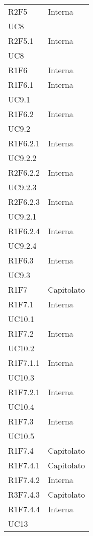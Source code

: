\begin{longtable}{|C{6.5cm}|C{6.5cm}|}
	R2F5 &  \centering Interna \\ UC8 \tabularnewline

	R2F5.1 &  \centering Interna \\ UC8 \tabularnewline

	R1F6 & Interna \\

	R1F6.1 & \centering Interna \\ UC9.1 \tabularnewline

	R1F6.2 & \centering Interna \\ UC9.2 \tabularnewline

	R1F6.2.1 & \centering Interna \\ UC9.2.2 \tabularnewline

	R2F6.2.2 & \centering Interna \\ UC9.2.3 \tabularnewline

	R2F6.2.3 & \centering Interna \\ UC9.2.1 \tabularnewline

	R1F6.2.4 & \centering Interna \\ UC9.2.4 \tabularnewline

	R1F6.3 & \centering Interna \\ UC9.3 \tabularnewline

	R1F7 & Capitolato \\

	R1F7.1 & \centering Interna \\ UC10.1 \tabularnewline

	R1F7.2 &  \centering Interna \\ UC10.2 \tabularnewline

	R1F7.1.1 & \centering Interna \\ UC10.3 \tabularnewline

	R1F7.2.1 &   \centering Interna \\ UC10.4 \tabularnewline
	
	R1F7.3 & \centering Interna \\ UC10.5 \tabularnewline

	R1F7.4 &   Capitolato \\

	R1F7.4.1 &  Capitolato \\

	R1F7.4.2 &  Interna \\

	R3F7.4.3 &  Capitolato \\

	R1F7.4.4 &  \centering Interna \\ UC13 \tabularnewline


\end{longtable}
